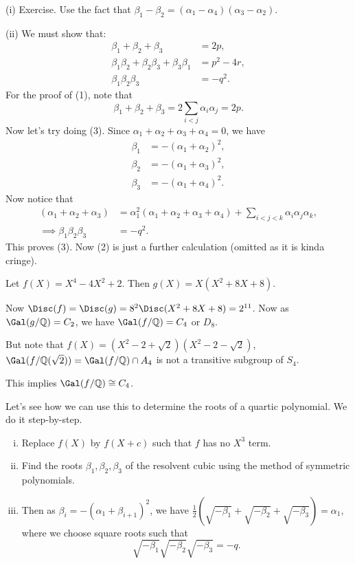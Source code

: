 \documentclass[12pt]{article}
\begin{document}
\begin{proofbox}


	(i) Exercise. Use the fact that $\beta_1 - \beta_2 = (\alpha_1 - \alpha_4)(\alpha_3 - \alpha_2)$.

	(ii) We must show that:
	\begin{align*}
		\beta_1 + \beta_2 + \beta_3 &= 2p, \tag{1}\\
		\beta_1 \beta_2 + \beta_2 \beta_3 + \beta_3 \beta_1 &= p^2 - 4r, \tag{2}\\
		\beta_1\beta_2\beta_3 &= -q^2 \tag{3}.
	\end{align*}
	For the proof of (1), note that
	\[
	\beta_1 + \beta_2 + \beta_3 = 2 \sum_{i < j} \alpha_i \alpha_j = 2p.
	\]
	Now let's try doing (3). Since $\alpha_1 + \alpha_2 + \alpha_3 + \alpha_4 = 0$, we have
	\begin{align*}
		\beta_1 &= -(\alpha_1 + \alpha_2)^2,\\
		\beta_2 &= -(\alpha_1 + \alpha_3)^2,\\
		\beta_3 &= -(\alpha_1+\alpha_4)^2.
	\end{align*}
	Now notice that
	\begin{align*}
		(\alpha_1 + \alpha_2 + \alpha_3) &= \alpha_1^2(\alpha_1 + \alpha_2 + \alpha_3 + \alpha_4) + \sum_{i < j < k} \alpha_i \alpha_j \alpha_k, \\
		\implies \beta_1 \beta_2 \beta_3 &= -q^2.
	\end{align*}
	This proves (3). Now (2) is just a further calculation (omitted as it is kinda cringe).
\end{proofbox}

\begin{exbox}
	Let $f(X) = X^4 - 4 X^2 + 2$. Then $g(X) = X(X^2 + 8X + 8)$.

	Now $\Disc(f) = \Disc(g) = 8^2 \Disc(X^2 + 8X + 8) = 2^{11}$. Now as $\Gal(g/\mathbb{Q}) = C_2$, we have $\Gal(f/\mathbb{Q}) = C_4$ or $D_8$.

	But note that $f(X) = (X^2 - 2 + \sqrt 2)(X^2 - 2 - \sqrt 2)$, $\Gal(f/\mathbb{Q}(\sqrt 2)) = \Gal(f/\mathbb{Q}) \cap A_4$ is not a transitive subgroup of $S_4$.

	This implies $\Gal(f/\mathbb{Q}) \cong C_4$.
\end{exbox}

Let's see how we can use this to determine the roots of a quartic polynomial. We do it step-by-step.
\begin{enumerate}[(i)]
	\item Replace $f(X)$ by $f(X+c)$ such that $f$ has no $X^3$ term.
	\item Find the roots $\beta_1, \beta_2, \beta_3$ of the resolvent cubic using the method of symmetric polynomials.
	\item Then as $\beta_i = -(\alpha_1 + \beta_{i+1})^2$, we have $\frac{1}{2}(\sqrt{-\beta_1} + \sqrt{-\beta_2} + \sqrt{-\beta_3}) = \alpha_1$, where we choose square roots such that
		\[
			\sqrt{-\beta_1}\sqrt{-\beta_2}\sqrt{-\beta_3} = -q.
		\]
\end{enumerate}
\end{document}
